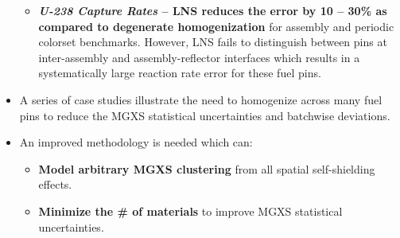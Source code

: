 \begin{highlightsbox}[frametitle=Highlights]
\begin{itemize}
\begin{itemize}
    \item \textbf{\textit{U-238 Capture Rates} -- \ac{LNS} reduces the error by 10 -- 30\% as compared to degenerate homogenization} for assembly and periodic colorset benchmarks. However, \ac{LNS} fails to distinguish between pins at inter-assembly and assembly-reflector interfaces which results in a systematically large reaction rate error for these fuel pins.
  \end{itemize}
  \item A series of case studies illustrate the need to homogenize across many fuel pins to reduce the \ac{MGXS} statistical uncertainties and batchwise deviations.
  \item An improved methodology is needed which can:
  \begin{itemize}  
     \item \textbf{Model arbitrary \ac{MGXS} clustering} from all spatial self-shielding effects.
     \item \textbf{Minimize the \# of materials} to improve \ac{MGXS} statistical uncertainties.
   \end{itemize}
\end{itemize}
\end{highlightsbox}
\vfill
